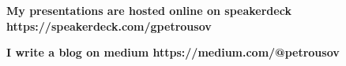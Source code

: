 


\begin{cventries}

\bfseries{My presentations are hosted online on speakerdeck https://speakerdeck.com/gpetrousov}

\bfseries{I write a blog on medium https://medium.com/@petrousov}



\end{cventries}